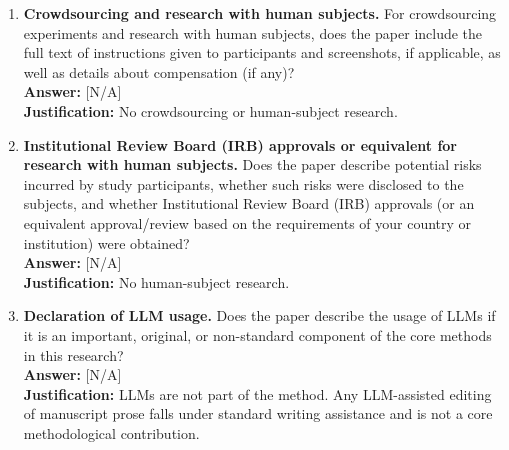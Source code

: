 \begin{enumerate}
  \item \textbf{Crowdsourcing and research with human subjects.} For crowdsourcing experiments and research with human subjects, does the paper include the full text of instructions given to participants and screenshots, if applicable, as well as details about compensation (if any)?\\
  \textbf{Answer:} [N/A]\\
  \textbf{Justification:} No crowdsourcing or human-subject research.

  \item \textbf{Institutional Review Board (IRB) approvals or equivalent for research with human subjects.} Does the paper describe potential risks incurred by study participants, whether such risks were disclosed to the subjects, and whether Institutional Review Board (IRB) approvals (or an equivalent approval/review based on the requirements of your country or institution) were obtained?\\
  \textbf{Answer:} [N/A]\\
  \textbf{Justification:} No human-subject research.

  \item \textbf{Declaration of LLM usage.} Does the paper describe the usage of LLMs if it is an important, original, or non-standard component of the core methods in this research?\\
  \textbf{Answer:} [N/A]\\
  \textbf{Justification:} LLMs are not part of the method. Any LLM-assisted editing of manuscript prose falls under standard writing assistance and is not a core methodological contribution.

\end{enumerate}
